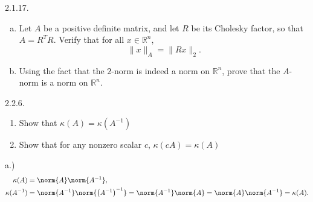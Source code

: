 \documentclass{report}
\begin{document}
    \bigbreak \noindent 
    \begin{mdframed}
        2.1.17. \begin{enumerate}[(a)]
            \item Let $A$ be a positive definite matrix, and let $R$ be its Cholesky factor, 
                so that $A = R^{T}R$. Verify that for all $x \in \mathbb{R}^n$, 
                \[
                    \|x\|_{A} = \|Rx\|_{2}.
                \]

            \item Using the fact that the $2$-norm is indeed a norm on $\mathbb{R}^n$, 
                prove that the $A$-norm is a norm on $\mathbb{R}^n$.
        \end{enumerate}
    \end{mdframed}

    \bigbreak \noindent 
    \begin{mdframed}
        2.2.6.
        \begin{enumerate}[label=(\alph*)]
            \item Show that $\kappa(A) = \kappa(A^{-1})$
            \item Show that for any nonzero scalar $c$, $\kappa(cA) = \kappa(A)$
        \end{enumerate}
    \end{mdframed}
    \bigbreak \noindent 
    a.)
    \begin{align*}
        \kappa(A) &= \norm{A}\norm{A^{-1}}, \\
        \kappa(A^{-1}) &= \norm{A^{-1}}\norm{\left(A^{-1}\right)^{-1}} = \norm{A^{-1}}\norm{A} = \norm{A}\norm{A^{-1}} = \kappa(A)
    .\end{align*}
\end{document}
